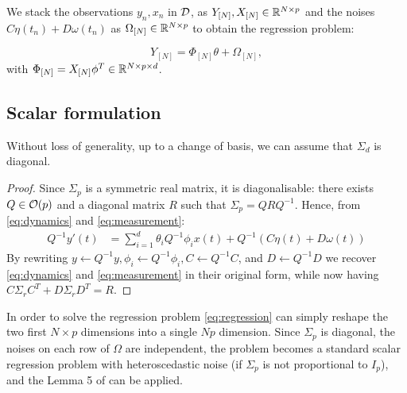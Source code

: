 \documentclass{article}
\begin{document}
We stack the observations $y_n, x_n$ in $\mathcal{D}$, as $Y_{[N]}, X_{[N]}\in\mathbb{R}^{N\times p}$ and the noises $C\eta(t_n)+D\omega(t_n)$ as $\Omega_{[N]} \in\mathbb{R}^{N\times p}$ to obtain the regression problem:

\begin{equation}
    \label{eq:regression}
    Y_{[N]} = \Phi_{[N]} \theta + \Omega_{[N]},
\end{equation}
with $\Phi_{[N]} = X_{[N]}\phi^T\in \mathbb{R}^{N\times p\times d}$.



\subsection{Scalar formulation}

\begin{proposition}
Without loss of generality, up to a change of basis, we can assume that $\Sigma_d$ is diagonal.
\end{proposition}
\begin{proof}
Since $\Sigma_p$ is a symmetric real matrix, it is diagonalisable: there exists $Q\in\mathcal{O}(p)$ and a diagonal matrix $R$ such that $\Sigma_p = QRQ^{-1}$. Hence, from \eqref{eq:dynamics} and \eqref{eq:measurement}:
\begin{align*}
    Q^{-1}y'(t) &= \sum_{i=1}^d \theta_i Q^{-1}\phi_i x(t) + Q^{-1}(C\eta(t) + D\omega(t))
\end{align*}
By rewriting $y \leftarrow Q^{-1}y, \phi_i\leftarrow Q^{-1}\phi_i, C\leftarrow Q^{-1}C$, and $D\leftarrow Q^{-1}D$ we recover \eqref{eq:dynamics} and \eqref{eq:measurement} in their original form, while now having $C\Sigma_rC^T + D\Sigma_rD^T = R$.
\end{proof}

In order to solve the regression problem \eqref{eq:regression} can simply reshape the two first $N\times p$ dimensions into a single $Np$ dimension. Since $\Sigma_p$ is diagonal, the noises on each row of $\Omega$ are independent, the problem becomes a standard scalar regression problem with heteroscedastic noise (if $\Sigma_p$ is not proportional to $I_p$), and the Lemma 5 of \citet{kirschner18heteroscedastic} can be applied.
\end{document}
